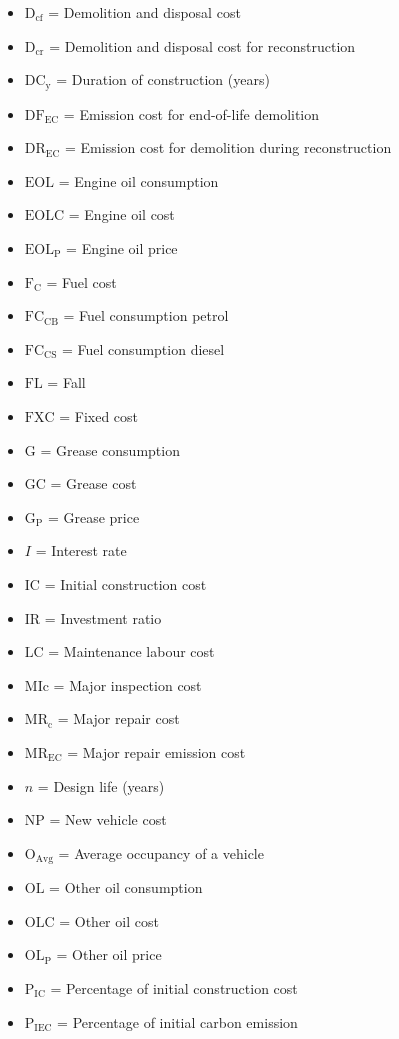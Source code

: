 \documentclass[12pt,a4paper]{article}
\begin{document}
\begin{itemize}
\item $\mathrm{D_{cf}}$ = Demolition and disposal cost
\item $\mathrm{D_{cr}}$ = Demolition and disposal cost for reconstruction
\item $\mathrm{DC_{y}}$ = Duration of construction (years)
\item $\mathrm{DF_{EC}}$ = Emission cost for end-of-life demolition
\item $\mathrm{DR_{EC}}$ = Emission cost for demolition during reconstruction
\item $\mathrm{EOL}$ = Engine oil consumption
\item $\mathrm{EOLC}$ = Engine oil cost
\item $\mathrm{EOL_{P}}$ = Engine oil price
\item $\mathrm{F_{C}}$ = Fuel cost
\item $\mathrm{FC_{CB}}$ = Fuel consumption petrol
\item $\mathrm{FC_{CS}}$ = Fuel consumption diesel
\item $\mathrm{FL}$ = Fall
\item $\mathrm{FXC}$ = Fixed cost
\item $\mathrm{G}$ = Grease consumption
\item $\mathrm{GC}$ = Grease cost
\item $\mathrm{G_{P}}$ = Grease price
\item $I$ = Interest rate
\item $\mathrm{IC}$ = Initial construction cost
\item $\mathrm{IR}$ = Investment ratio
\item $\mathrm{LC}$ = Maintenance labour cost
\item $\mathrm{MIc}$ = Major inspection cost
\item $\mathrm{MR_{c}}$ = Major repair cost
\item $\mathrm{MR_{EC}}$ = Major repair emission cost
\item $n$ = Design life (years)
\item $\mathrm{NP}$ = New vehicle cost
\item $\mathrm{O_{Avg}}$ = Average occupancy of a vehicle
\item $\mathrm{OL}$ = Other oil consumption
\item $\mathrm{OLC}$ = Other oil cost
\item $\mathrm{OL_{P}}$ = Other oil price
\item $\mathrm{P_{IC}}$ = Percentage of initial construction cost
\item $\mathrm{P_{IEC}}$ = Percentage of initial carbon emission

\end{itemize}
\end{document}
